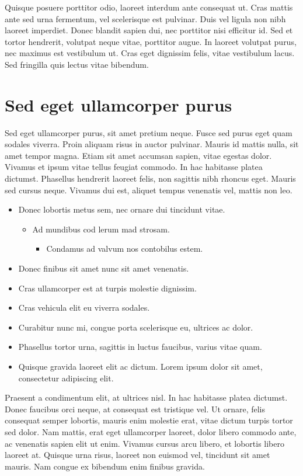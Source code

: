 Quisque posuere porttitor odio, laoreet interdum ante consequat ut.
Cras mattis ante sed urna fermentum, vel scelerisque est pulvinar.
Duis vel ligula non nibh laoreet imperdiet.
Donec blandit sapien dui, nec porttitor nisi efficitur id.
Sed et tortor hendrerit, volutpat neque vitae, porttitor augue.
In laoreet volutpat purus, nec maximus est vestibulum ut.
Cras eget dignissim felis, vitae vestibulum lacus.
Sed fringilla quis lectus vitae bibendum.

\section{Sed eget ullamcorper purus}

Sed eget ullamcorper purus, sit amet pretium neque.
Fusce sed purus eget quam sodales viverra.
Proin aliquam risus in auctor pulvinar.
Mauris id mattis nulla, sit amet tempor magna.
Etiam sit amet accumsan sapien, vitae egestas dolor.
Vivamus et ipsum vitae tellus feugiat commodo.
In hac habitasse platea dictumst.
Phasellus hendrerit laoreet felis, non sagittis nibh rhoncus eget.
Mauris sed cursus neque.
Vivamus dui est, aliquet tempus venenatis vel, mattis non leo.

\begin{itemize}
\item Donec lobortis metus sem, nec ornare dui tincidunt vitae.
\begin{itemize}
\item Ad mundibus cod lerum mad strosam.
\begin{itemize}
\item Condamus ad valvum nos contobilus estem.
\end{itemize}
\end{itemize}
\item Donec finibus sit amet nunc sit amet venenatis.
\item Cras ullamcorper est at turpis molestie dignissim.
\item Cras vehicula elit eu viverra sodales.
\item Curabitur nunc mi, congue porta scelerisque eu, ultrices ac dolor.
\item Phasellus tortor urna, sagittis in luctus faucibus, varius vitae quam.
\item Quisque gravida laoreet elit ac dictum. Lorem ipsum dolor sit amet, consectetur adipiscing elit.
\end{itemize}

Praesent a condimentum elit, at ultrices nisl.
In hac habitasse platea dictumst.
Donec faucibus orci neque, at consequat est tristique vel.
Ut ornare, felis consequat semper lobortis, mauris enim molestie erat, vitae dictum turpis tortor sed dolor.
Nam mattis, erat eget ullamcorper laoreet, dolor libero commodo ante, ac venenatis sapien elit ut enim.
Vivamus cursus arcu libero, et lobortis libero laoreet at.
Quisque urna risus, laoreet non euismod vel, tincidunt sit amet mauris.
Nam congue ex bibendum enim finibus gravida.

